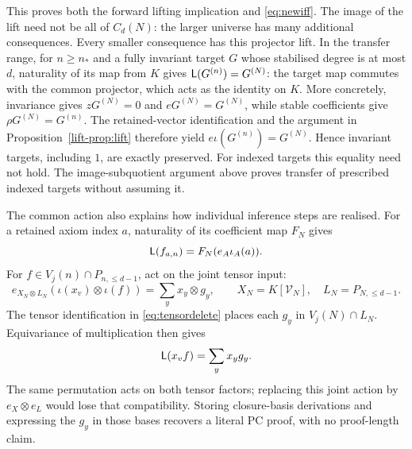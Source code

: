\documentclass[11pt,a4paper]{article}
\theoremstyle{definition}\newtheorem{definition}[theorem]{Definition}
\theoremstyle{remark}\newtheorem{remark}[theorem]{Remark}
\begin{document}
This proves both the forward lifting implication and
\eqref{eq:newiff}. The image of the lift need not be all of $C_d(N)$:
the larger universe has many additional consequences. Every smaller consequence has this projector lift. In the transfer range, for $n\ge n_*$ and a fully
invariant target $G$ whose stabilised degree is at most $d$, naturality of its map from $K$ gives
$\mathsf L(G^{(n)})=G^{(N)}$: the target map commutes with the common projector,
which acts as the identity on $K$. More concretely, invariance gives
$zG^{(N)}=0$ and $eG^{(N)}=G^{(N)}$, while stable coefficients give
$\rho G^{(N)}=G^{(n)}$. The retained-vector identification and the argument
in Proposition~\ref{lift-prop:lift} therefore yield $e\iota(G^{(n)})=G^{(N)}$. Hence invariant targets, including
$1$, are exactly preserved. For indexed targets this equality need
not hold. The image-subquotient argument above proves transfer of
prescribed indexed targets without assuming it.

The common action also explains how individual inference steps are
realised. For a retained axiom index $a$, naturality of its coefficient
map $F_N$ gives
\begin{equation}\label{lift-eq:axiomlift}
                 \mathsf L(f_{a,n})=F_N(e_A\iota_A(a)).
\end{equation}
For $f\in V_j(n)\cap P_{n,\le d-1}$, act on the joint tensor input:
\begin{equation}\label{lift-eq:jointlift}
 e_{X_N\otimes L_N}(\iota(x_v)\otimes\iota(f))
       =\sum_y x_y\otimes g_y,
 \qquad X_N=K[\mathcal V_N],\quad L_N=P_{N,\le d-1}.
\end{equation}
The tensor identification in \eqref{eq:tensordelete} places each
$g_y$ in $V_j(N)\cap L_N$. Equivariance of multiplication then gives
\begin{equation}\label{lift-eq:liftmul}
                         \mathsf L(x_vf)=\sum_y x_yg_y.
\end{equation}
The same permutation acts on both tensor factors; replacing this joint
action by $e_X\otimes e_L$ would lose that compatibility. Storing
closure-basis derivations and expressing the $g_y$ in those bases
recovers a literal PC proof, with no proof-length claim.
\end{document}
